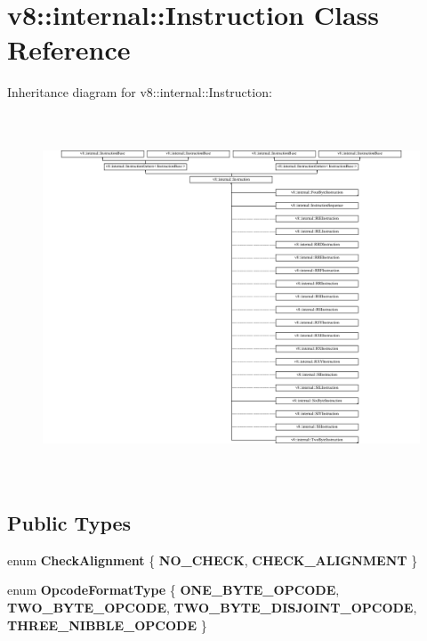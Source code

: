 \hypertarget{classv8_1_1internal_1_1Instruction}{}\section{v8\+:\+:internal\+:\+:Instruction Class Reference}
\label{classv8_1_1internal_1_1Instruction}
Inheritance diagram for v8\+:\+:internal\+:\+:Instruction\+:\begin{figure}[H]
\begin{center}
\leavevmode
\includegraphics[height=10.878378cm]{classv8_1_1internal_1_1Instruction}
\end{center}
\end{figure}
\subsection*{Public Types}
\begin{DoxyCompactItemize}
\item 
\mbox{\label{classv8_1_1internal_1_1Instruction_ac2dd89da7f115bc053a0a65209db0184}} 
enum {\bfseries Check\+Alignment} \{ {\bfseries N\+O\+\_\+\+C\+H\+E\+CK}, 
{\bfseries C\+H\+E\+C\+K\+\_\+\+A\+L\+I\+G\+N\+M\+E\+NT}
 \}
\item 
\mbox{\label{classv8_1_1internal_1_1Instruction_ac894b43bb5eb5aef647496c3e6233381}} 
enum {\bfseries Opcode\+Format\+Type} \{ {\bfseries O\+N\+E\+\_\+\+B\+Y\+T\+E\+\_\+\+O\+P\+C\+O\+DE}, 
{\bfseries T\+W\+O\+\_\+\+B\+Y\+T\+E\+\_\+\+O\+P\+C\+O\+DE}, 
{\bfseries T\+W\+O\+\_\+\+B\+Y\+T\+E\+\_\+\+D\+I\+S\+J\+O\+I\+N\+T\+\_\+\+O\+P\+C\+O\+DE}, 
{\bfseries T\+H\+R\+E\+E\+\_\+\+N\+I\+B\+B\+L\+E\+\_\+\+O\+P\+C\+O\+DE}
 \}
\end{DoxyCompactItemize}

